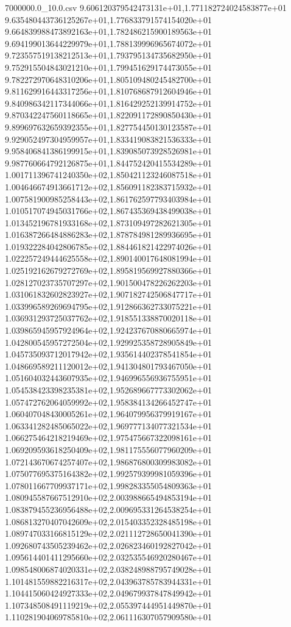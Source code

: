 \begin{filecontents*}{7000000.0_10.0.csv}
9.606120379542473131e+01,1.771182724024583877e+01
9.635480443736125267e+01,1.776833791574154020e+01
9.664839988473892163e+01,1.782486215900189563e+01
9.694199013644229979e+01,1.788139996965674072e+01
9.723557519138212513e+01,1.793795134735682950e+01
9.752915504843021210e+01,1.799451629174473055e+01
9.782272970648310206e+01,1.805109480245482700e+01
9.811629916443317256e+01,1.810768687912604946e+01
9.840986342117344066e+01,1.816429252139914752e+01
9.870342247560118665e+01,1.822091172890850430e+01
9.899697632659392355e+01,1.827754450130123587e+01
9.929052497304959957e+01,1.833419083821536333e+01
9.958406841386199915e+01,1.839085073928526981e+01
9.987760664792126875e+01,1.844752420415534289e+01
1.001711396741240350e+02,1.850421123246087518e+01
1.004646674913661712e+02,1.856091182383715932e+01
1.007581900985258443e+02,1.861762597793403984e+01
1.010517074945031766e+02,1.867435369438499038e+01
1.013452196781933168e+02,1.873109497282621305e+01
1.016387266484886283e+02,1.878784981289936695e+01
1.019322284042806785e+02,1.884461821422974026e+01
1.022257249444625558e+02,1.890140017648081994e+01
1.025192162679272769e+02,1.895819569927880366e+01
1.028127023735707297e+02,1.901500478226262203e+01
1.031061832602823927e+02,1.907182742506847717e+01
1.033996589269694795e+02,1.912866362733075221e+01
1.036931293725037762e+02,1.918551338870020118e+01
1.039865945957924964e+02,1.924237670880665974e+01
1.042800545957272504e+02,1.929925358728905849e+01
1.045735093712017942e+02,1.935614402378541854e+01
1.048669589211120012e+02,1.941304801793467050e+01
1.051604032443607935e+02,1.946996556936755951e+01
1.054538423398235381e+02,1.952689667773302062e+01
1.057472762064059992e+02,1.958384134266452747e+01
1.060407048430005261e+02,1.964079956379919167e+01
1.063341282485065022e+02,1.969777134077321534e+01
1.066275464218219469e+02,1.975475667322098161e+01
1.069209593618250409e+02,1.981175556077960209e+01
1.072143670674257407e+02,1.986876800309983082e+01
1.075077695375164382e+02,1.992579399981059396e+01
1.078011667709937171e+02,1.998283355054809363e+01
1.080945587667512910e+02,2.003988665494853194e+01
1.083879455236956488e+02,2.009695331264538254e+01
1.086813270407042609e+02,2.015403352328485198e+01
1.089747033166815129e+02,2.021112728650041390e+01
1.092680743505239462e+02,2.026823460192827042e+01
1.095614401411295660e+02,2.032535546920280467e+01
1.098548006874020331e+02,2.038248988795749028e+01
1.101481559882216317e+02,2.043963785783944331e+01
1.104415060424927333e+02,2.049679937847849942e+01
1.107348508491119219e+02,2.055397444951449870e+01
1.110281904069785810e+02,2.061116307057909580e+01

\end{filecontents*}
